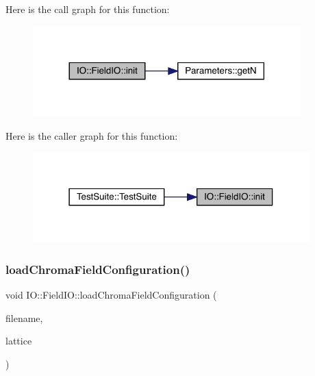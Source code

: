 Here is the call graph for this function\+:\nopagebreak
\begin{figure}[H]
\begin{center}
\leavevmode
\includegraphics[width=293pt]{class_i_o_1_1_field_i_o_ae01182be89137153bf043f9a34258601_cgraph}
\end{center}
\end{figure}
Here is the caller graph for this function\+:\nopagebreak
\begin{figure}[H]
\begin{center}
\leavevmode
\includegraphics[width=303pt]{class_i_o_1_1_field_i_o_ae01182be89137153bf043f9a34258601_icgraph}
\end{center}
\end{figure}
\mbox{\label{class_i_o_1_1_field_i_o_a8d6ea988658b107eca71c858d3816c99}} 
\subsubsection{\texorpdfstring{loadChromaFieldConfiguration()}{loadChromaFieldConfiguration()}}
{\footnotesize\ttfamily void I\+O\+::\+Field\+I\+O\+::load\+Chroma\+Field\+Configuration (\begin{DoxyParamCaption}\item[{std\+::string}]{filename,  }\item[{\mbox{\hyperlink{class_lattice}{Lattice}}$<$ \mbox{\hyperlink{class_s_u3}{S\+U3}} $>$ $\ast$}]{lattice }\end{DoxyParamCaption})\hspace{0.3cm}{\ttfamily [static]}}

